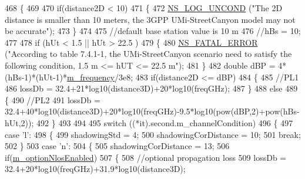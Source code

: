 \begin{DoxyCode}
468         \{
469 
470                 \textcolor{keywordflow}{if}(distance2D < 10)
471                 \{
472                         \hyperlink{log-macros-disabled_8h_a0b36e5e182b37194f85ef1c5e979fb2e}{NS\_LOG\_UNCOND} (\textcolor{stringliteral}{"The 2D distance is smaller than 10 meters, the 3GPP
       UMi-StreetCanyon model may not be accurate"});
473                 \}
474 
475                 \textcolor{comment}{//default base station value is 10 m}
476                 \textcolor{comment}{//hBs = 10;}
477 
478                 \textcolor{keywordflow}{if} (hUt < 1.5 || hUt > 22.5 )
479                 \{
480                         \hyperlink{group__fatal_ga5131d5e3f75d7d4cbfd706ac456fdc85}{NS\_FATAL\_ERROR} (\textcolor{stringliteral}{"According to table 7.4.1-1, the UMi-StreetCanyon
       scenario need to satisfy the following condition, 1.5 m <= hUT <= 22.5 m"});
481                 \}
482                 \textcolor{keywordtype}{double} dBP = 4*(hBs-1)*(hUt-1)*\hyperlink{classMmWave3gppPropagationLossModel_a2e61a4ea86089b9f974dbbb5180f9c86}{m\_frequency}/3e8;
483                 \textcolor{keywordflow}{if}(distance2D <= dBP)
484                 \{
485                         \textcolor{comment}{//PL1}
486                         lossDb = 32.4+21*log10(distance3D)+20*log10(freqGHz);
487                 \}
488                 \textcolor{keywordflow}{else}
489                 \{
490                         \textcolor{comment}{//PL2}
491                         lossDb = 32.4+40*log10(distance3D)+20*log10(freqGHz)-9.5*log10(pow(dBP,2)+pow(hBs-
      hUt,2));
492                 \}
493 
494 
495                 \textcolor{keywordflow}{switch} ((*it).second.m\_channelCondition)
496                 \{
497                         \textcolor{keywordflow}{case} \textcolor{charliteral}{'l'}:
498                         \{
499                                 shadowingStd = 4;
500                                 shadowingCorDistance = 10;
501                                 \textcolor{keywordflow}{break};
502                         \}
503                         \textcolor{keywordflow}{case} \textcolor{charliteral}{'n'}:
504                         \{
505                                 shadowingCorDistance = 13;
506                                 \textcolor{keywordflow}{if}(\hyperlink{classMmWave3gppPropagationLossModel_a5029858358d3c4dac793ebf3c8c6cc09}{m\_optionNlosEnabled})
507                                 \{
508                                         \textcolor{comment}{//optional propagation loss}
509                                         lossDb = 32.4+20*log10(freqGHz)+31.9*log10(distance3D);

\end{DoxyCode}
